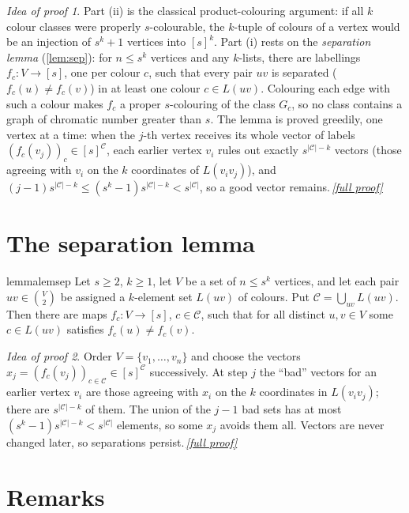 \documentclass[11pt,a4paper]{article}
\theoremstyle{plain}
\theoremstyle{definition}
\theoremstyle{remark}
\newtheorem*{proofidea}{Idea of proof}
\newcommand{\fullproofref}[1]{\,\hyperref[#1]{\textit{[full proof]}}}
\newcommand{\cC}{\mathcal C}
\begin{document}
\begin{proofidea}
Part (ii) is the classical product-colouring argument: if all $k$ colour classes were properly $s$-colourable, the $k$-tuple of colours of a vertex would be an injection of $s^k+1$ vertices into $[s]^k$. Part (i) rests on the \emph{separation lemma} (\cref{lem:sep}): for $n\le s^k$ vertices and any $k$-lists, there are labellings $f_c:V\to[s]$, one per colour $c$, such that every pair $uv$ is separated ($f_c(u)\ne f_c(v)$) in at least one colour $c\in L(uv)$. Colouring each edge with such a colour makes $f_c$ a proper $s$-colouring of the class $G_c$, so no class contains a graph of chromatic number greater than $s$. The lemma is proved greedily, one vertex at a time: when the $j$-th vertex receives its whole vector of labels $(f_c(v_j))_c\in[s]^{\cC}$, each earlier vertex $v_i$ rules out exactly $s^{|\cC|-k}$ vectors (those agreeing with $v_i$ on the $k$ coordinates of $L(v_iv_j)$), and $(j-1)s^{|\cC|-k}\le(s^k-1)s^{|\cC|-k}<s^{|\cC|}$, so a good vector remains.\fullproofref{pf:main}
\end{proofidea}

\section{The separation lemma}\label{sec:sep}

\begin{restatable}{lemma}{lemsep}\label{lem:sep}
Let $s\ge2$, $k\ge1$, let $V$ be a set of $n\le s^k$ vertices, and let each pair $uv\in\binom V2$ be assigned a $k$-element set $L(uv)$ of colours. Put $\cC=\bigcup_{uv}L(uv)$. Then there are maps $f_c:V\to[s]$, $c\in\cC$, such that for all distinct $u,v\in V$ some $c\in L(uv)$ satisfies $f_c(u)\ne f_c(v)$.
\end{restatable}

\begin{proofidea}
Order $V=\{v_1,\dots,v_n\}$ and choose the vectors $x_j=(f_c(v_j))_{c\in\cC}\in[s]^{\cC}$ successively. At step $j$ the ``bad'' vectors for an earlier vertex $v_i$ are those agreeing with $x_i$ on the $k$ coordinates in $L(v_iv_j)$; there are $s^{|\cC|-k}$ of them. The union of the $j-1$ bad sets has at most $(s^k-1)s^{|\cC|-k}<s^{|\cC|}$ elements, so some $x_j$ avoids them all. Vectors are never changed later, so separations persist.\fullproofref{pf:sep}
\end{proofidea}

\section{Remarks}\label{sec:remarks}
\end{document}
